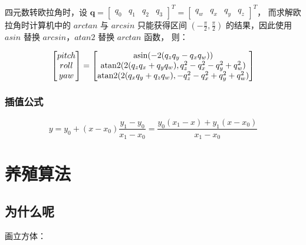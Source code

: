 四元数转欧拉角时，设 $\mathbf {q} ={\begin{bmatrix}q_{0}&q_{1}&q_{2}&q_{3}\end{bmatrix}}^{T}={\begin{bmatrix}q_{w}&q_{x}&q_{y}&q_{z}\end{bmatrix}}^{T}$，
而求解欧拉角时计算机中的 $arctan$ 与 $arcsin$ 只能获得区间 $(-\frac{\pi}{2},\frac{\pi}{2})$ 的结果，因此使用 $asin$ 替换 $arcsin$，$atan2$ 替换 $arctan$ 函数\cite{babylonZXY}，
则：

\begin{equation}
\begin{aligned}
  \begin{bmatrix}
    pitch \\ roll \\ yaw 
  \end{bmatrix}}={
    \begin{bmatrix}
      {\mbox{asin}}(-2(q_z q_y - q_x q_w))\\
      {\mbox{atan2}}(2(q_z q_x + q_y q_w), q_z^2 - q_x^2 - q_y^2 + q_w^2)\\
      {\mbox{atan2}}(2(q_x q_y + q_z q_w), -q_z^2 - q_x^2 + q_y^2 + q_w^2)
    \end{bmatrix}
\end{aligned}
\end{equation}

\subsubsection{插值公式}

\begin{equation}
  y=y_{0}+(x-x_{0}){\frac {y_{1}-y_{0}}{x_{1}-x_{0}}}={\frac {y_{0}(x_{1}-x)+y_{1}(x-x_{0})}{x_{1}-x_{0}}}
\end{equation}


\section{养殖算法}

\subsection{为什么呢}

画立方体：


